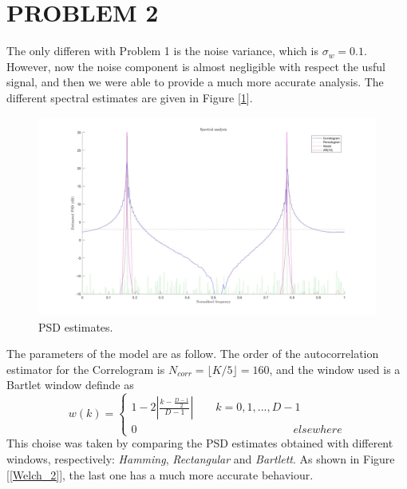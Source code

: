 \documentclass[a4paper,11pt,openright,twoside]{report}
\begin{document}
\clearpage
\section*{PROBLEM 2}
The only differen with Problem 1 is the noise variance, which is $\sigma_w=0.1$. However, now the noise component is almost negligible with respect the usful signal, and then we were able to provide a much more accurate analysis. The different spectral estimates are given in Figure [\ref{PSD_2}]. \\

\begin{figure}[h!]
	\centering
	\includegraphics[width=14cm]{images/PSD_2.jpg}
	\caption{PSD estimates.}\label{PSD_2} 
\end{figure}

The parameters of the model are as follow. The order of the autocorrelation estimator for the Correlogram is $ N_{corr} = \lfloor K/5 \rfloor = 160 $, and the window used is a Bartlet window definde as
\begin{equation}\label{Bart}
w(k) = \begin{cases}
1-2 \left | \frac{k-\frac{D-1}{2}}{D-1} \right | \quad \quad k=0,1,...,D-1 \\
0 \quad \quad \quad \quad \quad \quad \quad \quad \quad\quad \quad \quad \quad \quad elsewhere
\end{cases}
\end{equation} 
This choise was taken by comparing the PSD estimates obtained with different windows, respectively: \textit{Hamming}, \textit{Rectangular} and \textit{Bartlett}. As shown in Figure [\ref{Welch_2}], the last one has a much more accurate behaviour.
\end{document}
